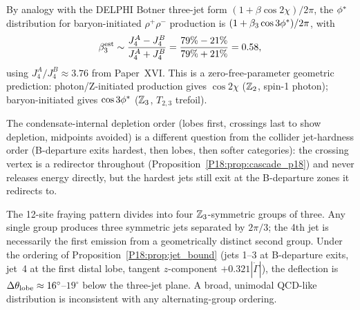 \begin{proposition}
\label{P18:prop:botner_analog}
By analogy with the DELPHI Botner three-jet form
$(1+\beta\cos2\chi)/2\pi$, the $\phi^*$ distribution for
baryon-initiated $\rho^+\rho^-$ production is
$(1+\beta_3\cos3\phi^*)/2\pi$, with
\begin{equation}
  \beta_3^{\rm est}\sim\frac{J_4^A-J_4^B}{J_4^A+J_4^B}
  =\frac{79\%-21\%}{79\%+21\%}=0.58,
\end{equation}
using $J_4^A/J_4^B\approx3.76$ from Paper~XVI. This is a
zero-free-parameter geometric prediction: photon/Z-initiated
production gives $\cos2\chi$ ($\mathbb{Z}_2$, spin-1 photon);
baryon-initiated gives $\cos3\phi^*$ ($\mathbb{Z}_3$, $T_{2,3}$
trefoil).
\end{proposition}

\begin{remark}
\label{P18:rem:two_orderings}
The condensate-internal depletion order (lobes first, crossings
last to show depletion, midpoints avoided) is a different question
from the collider jet-hardness order (B-departure exits hardest,
then lobes, then softer categories): the crossing vertex is a
redirector throughout (Proposition~\ref{P18:prop:cascade_p18}) and never
releases energy directly, but the hardest jets still exit at the
B-departure zones it redirects to.
\end{remark}

\begin{proposition}
\label{P18:prop:fourjet_oop}
The 12-site fraying pattern divides into four $\mathbb{Z}_3$-symmetric
groups of three. Any single group produces three symmetric jets
separated by $2\pi/3$; the 4th jet is necessarily the first emission
from a geometrically distinct second group. Under the ordering of
Proposition~\ref{P18:prop:jet_bound} (jets 1--3 at B-departure exits,
jet~4 at the first distal lobe, tangent $z$-component
$+0.321|\dot\Gamma|$), the deflection is
$\Delta\theta_{\rm lobe}\approx16^\circ$--$19^\circ$ below the
three-jet plane. A broad, unimodal QCD-like distribution is
inconsistent with any alternating-group ordering.
\end{proposition}

